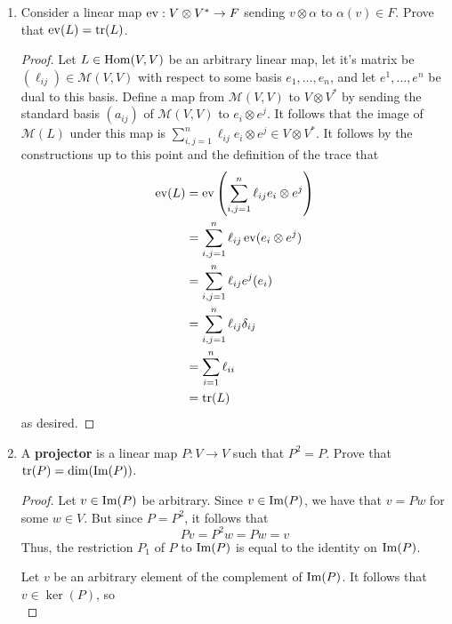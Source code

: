 \documentclass[../psets.tex]{subfiles}
\begin{document}
\begin{enumerate}
\begin{enumerate}
\begin{proof}
\begin{equation*}
            \end{equation*}
            where $1\in\Hom(V,V)$ is the identity map.
        \end{proof}
        \item Consider a linear map $\operatorname{ev}:V\otimes V^*\to F$ sending $v\otimes\alpha$ to $\alpha(v)\in F$. Prove that $\operatorname{ev}(L)=\tr(L)$.
        \begin{proof}
            Let $L\in\operatorname{Hom}(V,V)$ be an arbitrary linear map, let it's matrix be $(\ell_{ij})\in\mathcal{M}(V,V)$ with respect to some basis $e_1,\dots,e_n$, and let $e^1,\dots,e^n$ be dual to this basis. Define a map from $\mathcal{M}(V,V)$ to $V\otimes V^*$ by sending the standard basis $(a_{ij})$ of $\mathcal{M}(V,V)$ to $e_i\otimes e^j$. It follows that the image of $\mathcal{M}(L)$ under this map is $\sum_{i,j=1}^n\ell_{ij}e_i\otimes e^j\in V\otimes V^*$. It follows by the constructions up to this point and the definition of the trace that
            \begingroup
            \allowdisplaybreaks
            \begin{align*}
                \operatorname{ev}(L) &= \operatorname{ev}\left( \sum_{i,j=1}^n\ell_{ij}e_i\otimes e^j \right)\\
                &= \sum_{i,j=1}^n\ell_{ij}\operatorname{ev}(e_i\otimes e^j)\\
                &= \sum_{i,j=1}^n\ell_{ij}e^j(e_i)\\
                &= \sum_{i,j=1}^n\ell_{ij}\delta_{ij}\\
                &= \sum_{i=1}^n\ell_{ii}\\
                &= \tr(L)
            \end{align*}
            \endgroup
            as desired.
        \end{proof}
        \item A \textbf{projector} is a linear map $P:V\to V$ such that $P^2=P$. Prove that $\tr(P)=\dim(\operatorname{Im}(P))$.
        \begin{proof}
            Let $v\in\operatorname{Im}(P)$ be arbitrary. Since $v\in\operatorname{Im}(P)$, we have that $v=Pw$ for some $w\in V$. But since $P=P^2$, it follows that
            \begin{equation*}
                Pv = P^2w = Pw = v
            \end{equation*}
            Thus, the restriction $P_1$ of $P$ to $\operatorname{Im}(P)$ is equal to the identity on $\operatorname{Im}(P)$.\par
            Let $v$ be an arbitrary element of the complement of $\operatorname{Im}(P)$. It follows that $v\in\ker(P)$, so
            \begin{equation*}

\end{equation*}
\end{proof}
\end{enumerate}
\end{enumerate}
\end{document}
